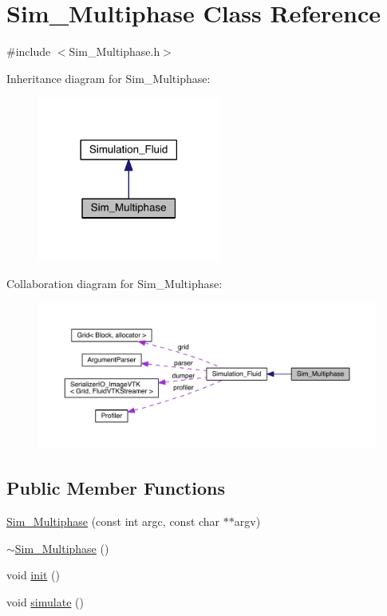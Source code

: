 \hypertarget{class_sim___multiphase}{}\section{Sim\+\_\+\+Multiphase Class Reference}
\label{class_sim___multiphase}


{\ttfamily \#include $<$Sim\+\_\+\+Multiphase.\+h$>$}



Inheritance diagram for Sim\+\_\+\+Multiphase\+:
\nopagebreak
\begin{figure}[H]
\begin{center}
\leavevmode
\includegraphics[width=170pt]{dc/dfd/class_sim___multiphase__inherit__graph}
\end{center}
\end{figure}


Collaboration diagram for Sim\+\_\+\+Multiphase\+:
\nopagebreak
\begin{figure}[H]
\begin{center}
\leavevmode
\includegraphics[width=350pt]{d4/d48/class_sim___multiphase__coll__graph}
\end{center}
\end{figure}
\subsection*{Public Member Functions}
\begin{DoxyCompactItemize}
\item 
\hyperlink{class_sim___multiphase_a3b0af387ee8f2d55cec7b4cc1376b13d}{Sim\+\_\+\+Multiphase} (const int argc, const char $\ast$$\ast$argv)
\item 
\hyperlink{class_sim___multiphase_a8d57a950fa22ed37b7bcd509a1c0b332}{$\sim$\+Sim\+\_\+\+Multiphase} ()
\item 
void \hyperlink{class_sim___multiphase_a52fb6d0f477493b813c148a8fce734a5}{init} ()
\item 
void \hyperlink{class_sim___multiphase_a3b39123c75007377af01c1bfb1267b44}{simulate} ()
\end{DoxyCompactItemize}
